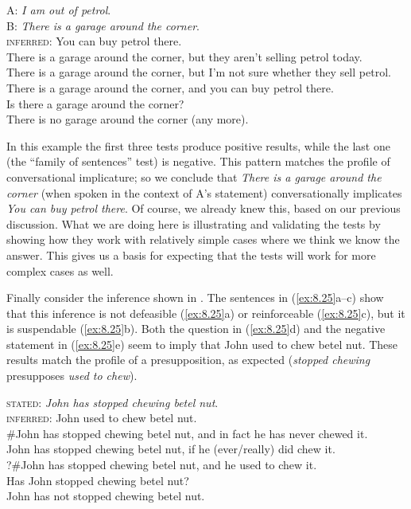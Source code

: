\begin{stylepoints} \label{ex:8.24}
A: \textit{I am out of petrol}.\\
B: \textit{There is a garage around the corner}.\\
\textsc{inferred}: You can buy petrol there.\\
\ea There is a garage around the corner, but they aren’t selling petrol today.\\
\ex There is a garage around the corner, but I’m not sure whether they sell petrol.\\
\ex There is a garage around the corner, and you can buy petrol there.\\
\ex Is there a garage around the corner?\\
\ex There is no garage around the corner (any more).
                       \z
\end{stylepoints}


In this example the first three tests produce positive results, while the last one (the “family of sentences” test) is negative. This pattern matches the profile of conversational implicature; so we conclude that \textit{There is a garage around the corner} (when spoken in the context of A’s statement) conversationally implicates \textit{You can buy petrol there}. Of course, we already knew this, based on our previous discussion. What we are doing here is illustrating and validating the tests by showing how they work with relatively simple cases where we think we know the answer. This gives us a basis for expecting that the tests will work for more complex cases as well.



Finally consider the inference shown in . The sentences in (\ref{ex:8.25}a--c) show that this inference is not defeasible (\ref{ex:8.25}a) or reinforceable (\ref{ex:8.25}c), but it is suspendable (\ref{ex:8.25}b). Both the question in (\ref{ex:8.25}d) and the negative statement in (\ref{ex:8.25}e) seem to imply that John used to chew betel nut. These results match the profile of a presupposition, as expected (\textit{stopped chewing} presupposes \textit{used to chew}).


\begin{stylepoints} \label{ex:8.25}
\textsc{stated}: \textit{John has stopped chewing betel nut}.\\
\textsc{inferred}: John used to chew betel nut.\\
\ea \#John has stopped chewing betel nut, and in fact he has never chewed it.\\
\ex John has stopped chewing betel nut, if he (ever/really) did chew it.\\
\ex ?\#John has stopped chewing betel nut, and he used to chew it.\\
\ex Has John stopped chewing betel nut?\\
\ex John has not stopped chewing betel nut.
                       \z
\end{stylepoints}


